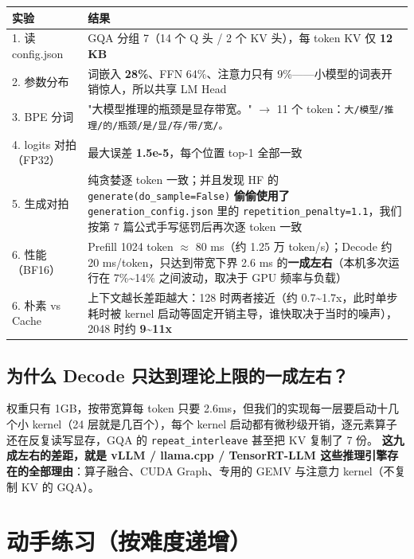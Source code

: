 \begin{center}
\small
\begin{tabularx}{\textwidth}{p{3.5cm} X}
\toprule
\textbf{实验} & \textbf{结果} \\
\midrule
1. 读 config.json & GQA 分组 7（14 个 Q 头 / 2 个 KV 头），每 token KV 仅 \textbf{12 KB} \\
2. 参数分布 & 词嵌入 \textbf{28\%}、FFN 64\%、注意力只有 9\%——小模型的词表开销惊人，所以共享 LM Head \\
3. BPE 分词 & "大模型推理的瓶颈是显存带宽。" $\rightarrow$ 11 个 token：\texttt{大/模型/推理/的/瓶颈/是/显/存/带/宽/。} \\
4. logits 对拍（FP32） & 最大误差 \textbf{1.5e-5}，每个位置 top-1 全部一致 \\
5. 生成对拍 & 纯贪婪逐 token 一致；并且发现 HF 的 \texttt{generate(do\_sample=False)} \textbf{偷偷使用了} \texttt{generation\_config.json} 里的 \texttt{repetition\_penalty=1.1}，我们按第 7 篇公式手写惩罚后再次逐 token 一致 \\
6. 性能（BF16） & Prefill 1024 token $\approx$ 80 ms（约 1.25 万 token/s）；Decode 约 20 ms/token，只达到带宽下界 2.6 ms 的\textbf{一成左右}（本机多次运行在 7\%\textasciitilde{}14\% 之间波动，取决于 GPU 频率与负载） \\
6. 朴素 vs Cache & 上下文越长差距越大：128 时两者接近（约 0.7\textasciitilde{}1.7x，此时单步耗时被 kernel 启动等固定开销主导，谁快取决于当时的噪声），2048 时约 \textbf{9\textasciitilde{}11x} \\
\bottomrule
\end{tabularx}
\end{center}

\subsection{为什么 Decode 只达到理论上限的一成左右？}

权重只有 1GB，按带宽算每 token 只要 2.6ms，但我们的实现每一层要启动十几个小 kernel（24 层就是几百个），每个 kernel 启动都有微秒级开销，逐元素算子还在反复读写显存，GQA 的 \texttt{repeat\_interleave} 甚至把 KV 复制了 7 份。
\textbf{这九成左右的差距，就是 vLLM / llama.cpp / TensorRT-LLM 这些推理引擎存在的全部理由}：算子融合、CUDA Graph、专用的 GEMV 与注意力 kernel（不复制 KV 的 GQA）。

\section{动手练习（按难度递增）}


